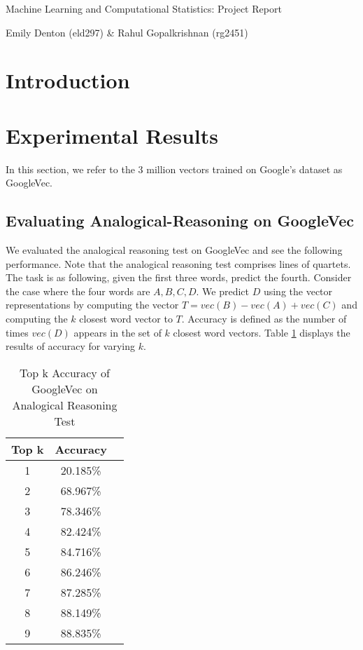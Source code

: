 \documentclass[11pt]{article}
\begin{document}
\vspace*{8cm}

\centerline{\sc \Large Machine Learning and Computational Statistics: Project Report}

\vspace{1cm}

\centerline{\sc \small Emily Denton (eld297)  \& Rahul Gopalkrishnan (rg2451)}
         
\clearpage 


\section{Introduction}

\section{Experimental Results}
In this section, we refer to the 3 million vectors trained on Google's dataset as GoogleVec. 

\subsection{Evaluating Analogical-Reasoning on GoogleVec}
We evaluated the analogical reasoning test on GoogleVec and see the following performance. Note that the analogical reasoning test comprises lines of quartets. The task is as following, given the first three words, predict the fourth. Consider the case where the four words are $A,B,C,D$. We predict $D$ using the vector representations by computing the vector $T=vec(B)-vec(A)+vec(C)$ and computing the $k$ closest word vector to $T$. Accuracy is defined as the number of times $vec(D)$ appears in the set of $k$ closest word vectors. Table \ref{tab:GoogleVecAcc} displays the results of accuracy for varying $k$.

\begin{table}[h]
	\caption{Top k Accuracy of GoogleVec on Analogical Reasoning Test}
	\label{tab:GoogleVecAcc}
	\centering
    \begin{tabular}{| c | c | c |}
    \hline
    \textbf{Top k} & \textbf{Accuracy} \\ \hline
    1 & 20.185\%  \\ \hline
    2 & 68.967\% \\ \hline
    3 & 78.346\% \\ \hline
    4 & 82.424\% \\ \hline
    5 & 84.716\% \\ \hline
    6 & 86.246\% \\ \hline
    7 & 87.285\% \\ \hline
    8 & 88.149\% \\ \hline
    9 & 88.835\% \\ \hline
    \end{tabular}
\end{table}
\end{document}
